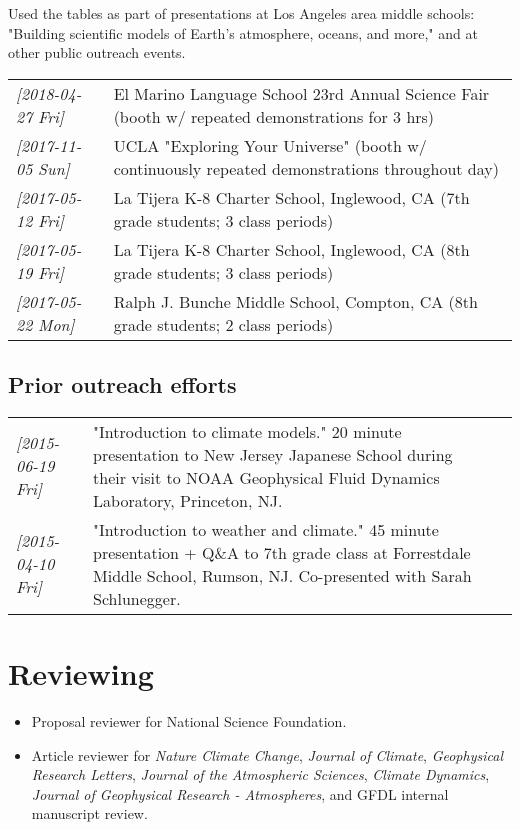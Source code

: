 \documentclass[12pt,letterpaper]{shillcv}
\begin{document}
Used the tables as part of presentations at Los Angeles area middle schools:
"Building scientific models of Earth's atmosphere, oceans, and more," and at
other public outreach events.
\begin{center}
\begin{tabular}{ll}
\textit{[2018-04-27 Fri]} & El Marino Language School 23rd Annual Science Fair (booth w/ repeated demonstrations for 3 hrs)\\
\textit{[2017-11-05 Sun]} & UCLA "Exploring Your Universe" (booth w/ continuously repeated demonstrations throughout day)\\
\textit{[2017-05-12 Fri]} & La Tijera K-8 Charter School, Inglewood, CA (7th grade students; 3 class periods)\\
\textit{[2017-05-19 Fri]} & La Tijera K-8 Charter School, Inglewood, CA (8th grade students; 3 class periods)\\
\textit{[2017-05-22 Mon]} & Ralph J. Bunche Middle School, Compton, CA (8th grade students; 2 class periods)\\
\end{tabular}
\end{center}
\subsection*{Prior outreach efforts}
\label{sec:orge4681ae}
\begin{center}
\begin{tabularx}{\textwidth}{lX}
\textit{[2015-06-19 Fri]} & "Introduction to climate models."  20 minute presentation to New Jersey Japanese School during their visit to NOAA Geophysical Fluid Dynamics Laboratory, Princeton, NJ. &  &  & \\
\textit{[2015-04-10 Fri]} & "Introduction to weather and climate."  45 minute presentation + Q\&A to 7th grade class at Forrestdale Middle School, Rumson, NJ.  Co-presented with Sarah Schlunegger. &  &  & \\
\end{tabularx}
\end{center}
\section*{Reviewing}
\label{sec:org0a3f817}
\begin{itemize}
\item Proposal reviewer for National Science Foundation.
\item Article reviewer for \emph{Nature Climate Change}, \emph{Journal of Climate},
\emph{Geophysical Research Letters}, \emph{Journal of the Atmospheric Sciences},
\emph{Climate Dynamics}, \emph{Journal of Geophysical Research - Atmospheres}, and GFDL
internal manuscript review.
\end{itemize}
\end{document}
